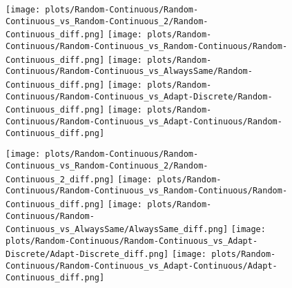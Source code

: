 \documentclass{article}
\begin{document}
\begin{itemize}
\begin{figure}[!h]
\begin{minipage}[c]{0.1\textwidth}
		\raggedleft
	\end{minipage}
	\begin{minipage}[c]{0.80\textwidth}
		\texttt{[image: plots/Random-Continuous/Random-Continuous\_vs\_Random-Continuous\_2/Random-Continuous\_diff.png]}\hfill
		\texttt{[image: plots/Random-Continuous/Random-Continuous\_vs\_Random-Continuous/Random-Continuous\_diff.png]}\hfill
		\texttt{[image: plots/Random-Continuous/Random-Continuous\_vs\_AlwaysSame/Random-Continuous\_diff.png]}\hfill
		\texttt{[image: plots/Random-Continuous/Random-Continuous\_vs\_Adapt-Discrete/Random-Continuous\_diff.png]}\hfill
		\texttt{[image: plots/Random-Continuous/Random-Continuous\_vs\_Adapt-Continuous/Random-Continuous\_diff.png]}\hfill
\end{minipage}
\end{figure}
\begin{figure}[!h]
	\centering
	\begin{minipage}[c]{0.1\textwidth}
		\raggedleft
	\end{minipage}
	\begin{minipage}[c]{0.80\textwidth}
		\texttt{[image: plots/Random-Continuous/Random-Continuous\_vs\_Random-Continuous\_2/Random-Continuous\_2\_diff.png]}\hfill
		\texttt{[image: plots/Random-Continuous/Random-Continuous\_vs\_Random-Continuous/Random-Continuous\_diff.png]}\hfill
		\texttt{[image: plots/Random-Continuous/Random-Continuous\_vs\_AlwaysSame/AlwaysSame\_diff.png]}\hfill
		\texttt{[image: plots/Random-Continuous/Random-Continuous\_vs\_Adapt-Discrete/Adapt-Discrete\_diff.png]}\hfill
		\texttt{[image: plots/Random-Continuous/Random-Continuous\_vs\_Adapt-Continuous/Adapt-Continuous\_diff.png]}\hfill
\end{minipage}
\end{figure}
\begin{figure}[!h]
	\centering
	\begin{minipage}[c]{0.1\textwidth}
		\raggedleft
	\end{minipage}

\end{figure}
\end{itemize}
\end{document}
